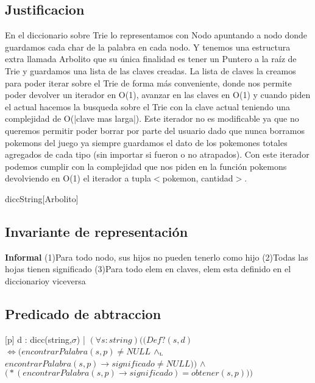 \begin{Representacion}


\subsection{Justificacion}
En el diccionario sobre Trie lo representamos con Nodo apuntando a nodo donde guardamos cada char de la palabra en cada nodo. Y tenemos una estructura extra llamada Arbolito que su única finalidad es tener un Puntero a la ra\'iz de Trie y guardamos una lista de las claves creadas. La lista de claves la creamos para poder iterar sobre el Trie de forma m\'as conveniente, donde nos permite poder devolver un iterador en O(1), avanzar en las claves en O(1) y cuando piden el actual hacemos la busqueda sobre el Trie con la clave actual teniendo una complejidad de O(|clave mas larga|).
Este iterador no es modificable ya que no queremos permitir poder borrar por parte del usuario dado que nunca borramos pokemons del juego ya siempre guardamos el dato de los pokemones totales agregados de cada tipo (sin importar si fueron o no atrapados).
Con este iterador podemos cumplir con la complejidad que nos piden en la funci\'on pokemons devolviendo en O(1) el iterador a tupla$<$pokemon, cantidad$>$.
	\begin{Estructura}{diccString}[Arbolito]
		\begin{Tupla}[Arbolito]
		\end{Tupla}
		\begin{Tupla}[nodo]
		\end{Tupla}
	\end{Estructura}
\subsection{Invariante de representación}

\textbf{Informal}
(1)Para todo nodo, sus hijos no pueden tenerlo como hijo
(2)Todas las hojas tienen significado
(3)Para todo elem en claves, elem esta definido en el diccionarioy viceversa

\subsection{Predicado de abtraccion}

[p]{ d : dicc(string,$\sigma$) | $(\forall s:string)\Big( \big(Def?(s,d)$ $\Longleftrightarrow (encontrarPalabra(s,p) \neq NULL$ $\land_{\mathrm{\scriptscriptstyle{L}}}$ $encontrarPalabra(s,p)\to significado \neq NULL)\big)$ $\land$ $\big(*(encontrarPalabra(s,p)\to significado) = obtener(s,p)\big)\Big)$}



\end{Representacion}
